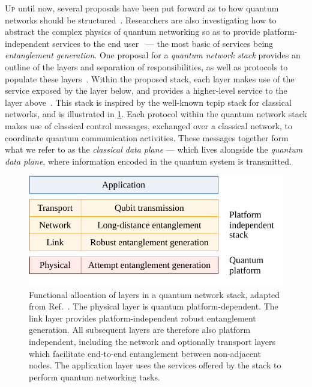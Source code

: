 \lettrine{U}{p} until now, several proposals have been put forward as to how quantum networks should
be structured~\cite{van_meter_2013_repeaters, schoute_2016_shortcuts, joshi_2020_trusted}.
Researchers are also investigating how to abstract the complex physics of quantum networking so as
to provide platform-independent services to the end user~\cite{dahlberg_2019_egp,
pirker_2019_quantum, illiano_2022_quantum} --- the most basic of services being \emph{entanglement
generation}. One proposal for a \emph{quantum network stack} provides an outline of the layers and
separation of responsibilities, as well as protocols to populate these
layers~\cite{dahlberg_2019_egp, kozlowski_2020_qnp}. Within the proposed stack, each layer makes use
of the service exposed by the layer below, and provides a higher-level service to the layer
above~\cite{dahlberg_2019_egp}. This stack is inspired by the well-known \acrshort{tcpip} stack for
classical networks, and is illustrated in \cref{fig:functional-allocation}. Each protocol within the
quantum network stack makes use of classical control messages, exchanged over a classical network,
to coordinate quantum communication activities. These messages together form what we refer to as the
\emph{classical data plane} --- which lives alongside the \emph{quantum data plane}, where
information encoded in the quantum system is transmitted.

\begin{figure}[b]
    \centering
    \includegraphics[width=0.6\linewidth]{figures/functional-allocation.pdf}
    \caption{
        Functional allocation of layers in a quantum network stack, adapted from
        Ref.~\cite{dahlberg_2019_egp}. The physical layer is quantum platform-dependent. The link
        layer provides platform-independent robust entanglement generation. All subsequent layers
        are therefore also platform independent, including the network and optionally transport
        layers which facilitate end-to-end entanglement between non-adjacent nodes. The application
        layer uses the services offered by the stack to perform quantum networking tasks.
    }
    \label{fig:functional-allocation}
\end{figure}


